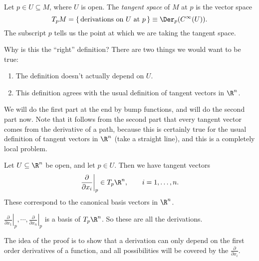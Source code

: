 \documentclass[a4paper]{article}
\begin{document}
\begin{defi}
  Let $p \in U \subseteq M$, where $U$ is open. The \emph{tangent space} of $M$ at $p$ is the vector space
  \[
    T_p M = \{ \, \text{derivations on $U$ at $p$} \, \} \equiv \Der_p(C^\infty(U)).
  \]
  The subscript $p$ tells us the point at which we are taking the tangent space.
\end{defi}
Why is this the ``right'' definition? There are two things we would want to be true:
\begin{enumerate}
  \item The definition doesn't actually depend on $U$.
  \item This definition agrees with the usual definition of tangent vectors in $\R^n$.
\end{enumerate}
We will do the first part at the end by bump functions, and will do the second part now. Note that it follows from the second part that every tangent vector comes from the derivative of a path, because this is certainly true for the usual definition of tangent vectors in $\R^n$ (take a straight line), and this is a completely local problem.

\begin{eg}
  Let $U \subseteq \R^n$ be open, and let $p \in U$. Then we have tangent vectors
  \[
    \left.\frac{\partial}{\partial x_i}\right|_p \in T_p \R^n, \qquad i = 1, \ldots, n.
  \]
  These correspond to the canonical basis vectors in $\R^n$.
\end{eg}

\begin{lemma}
  $\left.\frac{\partial}{\partial x_1}\right|_p, \cdots, \left.\frac{\partial}{\partial x_n}\right|_p$ is a basis of $T_p \R^n$. So these are all the derivations.
\end{lemma}

The idea of the proof is to show that a derivation can only depend on the first order derivatives of a function, and all possibilities will be covered by the $\frac{\partial}{\partial x_i}$.
\end{document}
